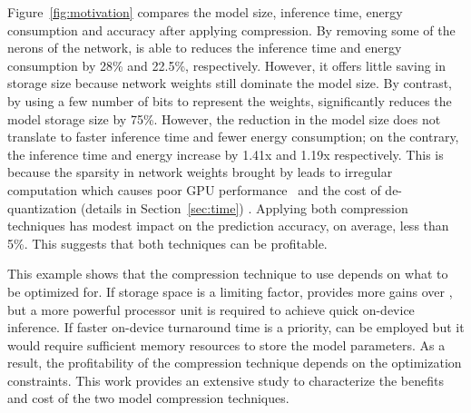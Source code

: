  Figure~\ref{fig:motivation} compares the model size, inference time, energy consumption and accuracy after
applying compression. By removing some of the nerons of the network, \pruning is able to reduces the inference time and energy consumption
by 28\% and 22.5\%, respectively. However, it offers little saving in storage size because network weights still dominate the model size.
By contrast, by using a few number of bits to represent the weights, \quantization significantly reduces the model storage size by 75\%.
However, the reduction in the model size does not translate to faster inference time and fewer energy consumption; on the contrary, the
inference time and energy increase by 1.41x and 1.19x respectively. This is because the sparsity in network weights brought by
\quantization leads to irregular computation which causes poor GPU performance~\cite{DBLP:journals/corr/abs-1802-10280} and the cost of
de-quantization (details in Section~\ref{sec:time}) . Applying both compression techniques has modest impact on the prediction accuracy, on
average, less than 5\%. This suggests that both techniques can be profitable.

 This example shows that the compression technique to use depends on what to be optimized for. If storage
space is a limiting factor, \quantization provides more gains over \pruning, but a more powerful processor unit is required to achieve
quick on-device inference. If faster on-device turnaround time is a priority, \pruning can be employed but it would require sufficient
memory resources to store the model parameters.  As a result, the profitability of the compression technique depends on the optimization
constraints. This work provides an extensive study to characterize the benefits and cost of the two model compression techniques.
